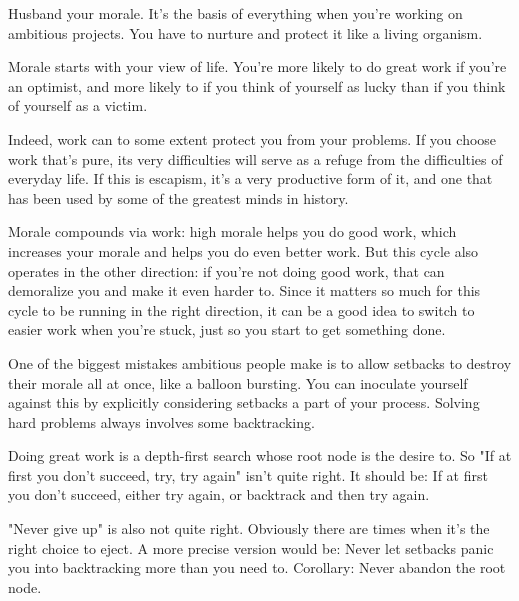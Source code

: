                   Husband your morale. It's the basis of everything when you're
                  working on ambitious projects. You have to nurture and protect
                  it like a living organism.

Morale starts with your
                  view of life. You're more likely to do great work if you're an
                  optimist, and more likely to if you think of yourself as lucky
                  than if you think of yourself as a victim.

Indeed,
                  work can to some extent protect you from your problems. If you
                  choose work that's pure, its very difficulties will serve as a
                  refuge from the difficulties of everyday life. If this is
                  escapism, it's a very productive form of it, and one that has
                  been used by some of the greatest minds in history.

Morale
                  compounds via work: high morale helps you do good work, which
                  increases your morale and helps you do even better work. But
                  this cycle also operates in the other direction: if you're not
                  doing good work, that can demoralize you and make it even
                  harder to. Since it matters so much for this cycle to be
                  running in the right direction, it can be a good idea to
                  switch to easier work when you're stuck, just so you start to
                  get something done.

One of the biggest mistakes
                  ambitious people make is to allow setbacks to destroy their
                  morale all at once, like a balloon bursting. You can inoculate
                  yourself against this by explicitly considering setbacks a
                  part of your process. Solving hard problems always involves
                  some backtracking.

Doing great work is a
                  depth-first search whose root node is the desire to. So "If at
                  first you don't succeed, try, try again" isn't quite right. It
                  should be: If at first you don't succeed, either try again, or
                  backtrack and then try again.

"Never give up" is
                  also not quite right. Obviously there are times when it's the
                  right choice to eject. A more precise version would be: Never
                  let setbacks panic you into backtracking more than you need
                  to. Corollary: Never abandon the root node.

